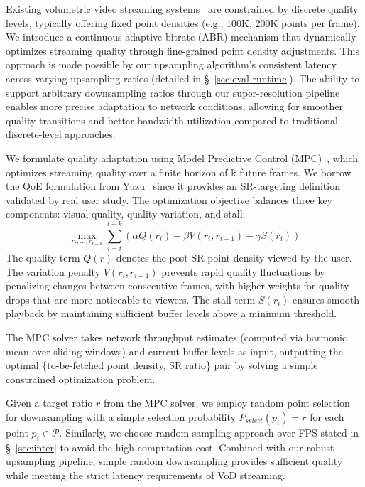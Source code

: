 

Existing volumetric video streaming systems~\cite{han_vivo_2020,zhang_yuzu_nodate,lee_groot_2020} are constrained by discrete quality levels, typically offering fixed point densities (e.g., 100K, 200K points per frame). We introduce a continuous adaptive bitrate (ABR) mechanism that dynamically optimizes streaming quality through fine-grained point density adjustments. This approach is made possible by our upsampling algorithm's consistent latency across varying upsampling ratios (detailed in \S~\ref{sec:eval-runtime}). The ability to support arbitrary downsampling ratios through our super-resolution pipeline enables more precise adaptation to network conditions, allowing for smoother quality transitions and better bandwidth utilization compared to traditional discrete-level approaches.

We formulate quality adaptation using Model Predictive Control (MPC)~\cite{yinControlTheoreticApproachDynamic2015}, which optimizes streaming quality over a finite horizon of k future frames. We borrow the QoE formulation from Yuzu~\cite{zhang_yuzu_nodate} since it provides an SR-targeting definition validated by real user study. The optimization objective balances three key components: visual quality, quality variation, and stall:
\begin{equation}
\max_{r_t,...,r_{t+k}} \sum_{i=t}^{t+k} (\alpha Q(r_i) - \beta V(r_i, r_{i-1}) - \gamma S(r_i))
\end{equation}
The quality term $Q(r)$ denotes the post-SR point density viewed by the user. The variation penalty $V(r_i, r_{i-1})$ prevents rapid quality fluctuations by penalizing changes between consecutive frames, with higher weights for quality drops that are more noticeable to viewers. The stall term $S(r_i)$ ensures smooth playback by maintaining sufficient buffer levels above a minimum threshold.

The MPC solver takes network throughput estimates (computed via harmonic mean over sliding windows) and current buffer levels as input, outputting the optimal \{to-be-fetched point density, SR ratio\} pair by solving a simple constrained optimization problem.


Given a target ratio $r$ from the MPC solver, we employ random point selection for downsampling with a simple selection probability $P_{select}(p_i) = r$ for each point $p_i \in \mathcal{P}$. 
Similarly, we choose random sampling approach over FPS stated in \S~\ref{sec:inter} to avoid the high computation cost. Combined with our robust upsampling pipeline, simple random downsampling provides sufficient quality while meeting the strict latency requirements of VoD streaming.

